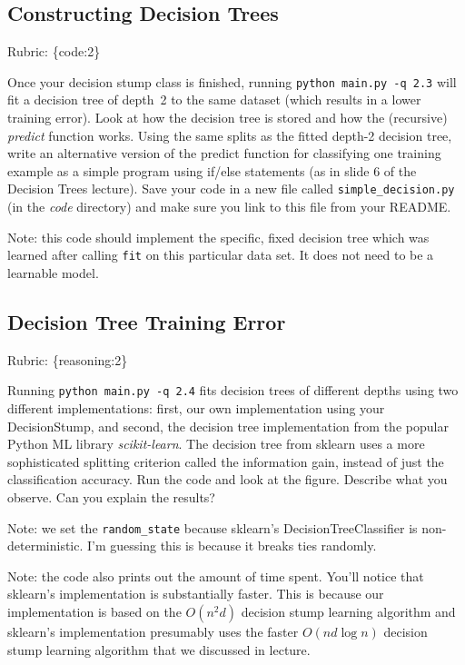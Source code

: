 \documentclass{article}
\def\blu#1{{\color{blu}#1}}
\def\gre#1{{\color{gre}#1}}
\def\rubric#1{\gre{Rubric: \{#1\}}}{}
\begin{document}
\subsection{Constructing Decision Trees}
\rubric{code:2}

Once your decision stump class is finished, running \texttt{python main.py -q 2.3} will fit
a decision tree of depth~2 to the same dataset (which results in a lower training error).
Look at how the decision tree is stored and how the (recursive) \emph{predict} function works.
\blu{Using the same splits as the fitted depth-2 decision tree, write an alternative version of the predict
function for classifying one training example as a simple program using if/else statements
(as in slide 6 of the Decision Trees lecture).} Save your code in a new file called
\texttt{simple\string_decision.py} (in the \emph{code} directory) and make sure you link to this file from your README.

Note: this code should implement the specific, fixed decision tree
which was learned after calling \texttt{fit} on this particular data set. It does not need to be a learnable model.

\subsection{Decision Tree Training Error}
\rubric{reasoning:2}

Running \texttt{python main.py -q 2.4} fits decision trees of different depths using two different implementations: first,
our own implementation using your DecisionStump, and second, the decision tree implementation from the popular Python ML library \emph{scikit-learn}.
The decision tree from sklearn uses a more sophisticated splitting criterion called the information gain, instead of just the classification accuracy.
Run the code and look at the figure.
\blu{Describe what you observe. Can you explain the results?}

Note: we set the \verb|random_state| because sklearn's DecisionTreeClassifier is non-deterministic. I'm guessing this is
because it breaks ties randomly.

Note: the code also prints out the amount of time spent. You'll notice that sklearn's implementation is substantially faster. This is because
our implementation is based on the $O(n^2d)$ decision stump learning algorithm and sklearn's implementation presumably uses the faster $O(nd\log n)$
decision stump learning algorithm that we discussed in lecture.
\end{document}
